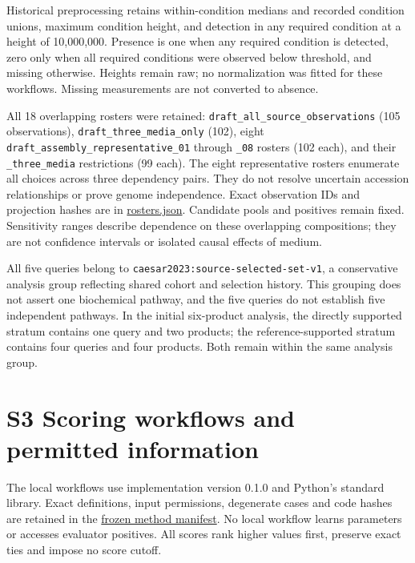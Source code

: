 \documentclass[
  10pt,
  a4paper,
]{article}
\begin{document}
Historical preprocessing retains within-condition medians and recorded condition unions, maximum condition height, and detection in any required condition at a height of 10,000,000. Presence is one when any required condition is detected, zero only when all required conditions were observed below threshold, and missing otherwise. Heights remain raw; no normalization was fitted for these workflows. Missing measurements are not converted to absence.

All 18 overlapping rosters were retained: \nolinkurl{draft_all_source_observations} (105 observations), \texttt{draft\_three\_media\_only} (102), eight \nolinkurl{draft_assembly_representative_01} through \texttt{\_08} rosters (102 each), and their \texttt{\_three\_media} restrictions (99 each). The eight representative rosters enumerate all choices across three dependency pairs. They do not resolve uncertain accession relationships or prove genome independence. Exact observation IDs and projection hashes are in \href{https://github.com/vinvomero/fungallink-benchmark/blob/main/data/processed/source-selected-gcf-analysis-v1/rosters.json}{rosters.json}. Candidate pools and positives remain fixed. Sensitivity ranges describe dependence on these overlapping compositions; they are not confidence intervals or isolated causal effects of medium.

All five queries belong to \nolinkurl{caesar2023:source-selected-set-v1}, a conservative analysis group reflecting shared cohort and selection history. This grouping does not assert one biochemical pathway, and the five queries do not establish five independent pathways. In the initial six-product analysis, the directly supported stratum contains one query and two products; the reference-supported stratum contains four queries and four products. Both remain within the same analysis group.

\section{S3 Scoring workflows and permitted information}\label{s3-scoring-workflows-and-permitted-information}

The local workflows use implementation version 0.1.0 and Python's standard library. Exact definitions, input permissions, degenerate cases and code hashes are retained in the \href{https://github.com/vinvomero/fungallink-benchmark/blob/main/data/processed/source-selected-gcf-analysis-v1/snapshots/data/manifests/baseline-methods.json}{frozen method manifest}. No local workflow learns parameters or accesses evaluator positives. All scores rank higher values first, preserve exact ties and impose no score cutoff.
\end{document}
